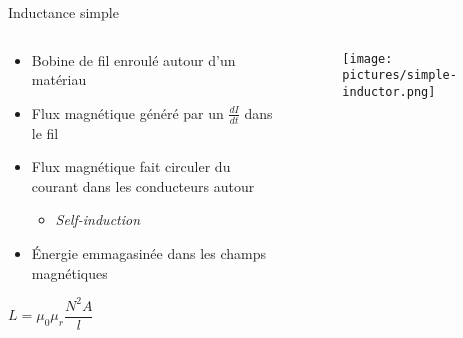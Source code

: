 \begin{frame}{Inductance simple}
    \begin{columns}
        \begin{column}{0.66\textwidth}
            \begin{itemize}
                \item Bobine de fil enroulé autour d'un matériau
                \item Flux magnétique généré par un $\frac{dI}{dt}$ dans le fil
                \item Flux magnétique fait circuler du courant dans les conducteurs autour
                \begin{itemize}
                    \item \textit{Self-induction}
                \end{itemize}
                \item Énergie emmagasinée dans les champs magnétiques
            \end{itemize}
            \par
            \Large{
            \begin{center}
                $L = \mu_0 \mu_r \dfrac{N^2A}{l}$
            \end{center}
            }
        \end{column}

        \begin{column}{0.33\textwidth}
            \begin{figure}
                \centering
                \texttt{[image: pictures/simple-inductor.png]}
            \end{figure}
        \end{column}
    \end{columns}
\end{frame}

